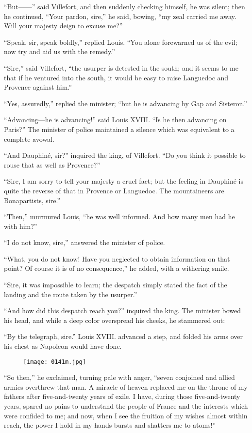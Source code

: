 “But——” said Villefort, and then suddenly checking himself, he was
silent; then he continued, “Your pardon, sire,” he said, bowing, “my
zeal carried me away. Will your majesty deign to excuse me?”

“Speak, sir, speak boldly,” replied Louis. “You alone forewarned us of
the evil; now try and aid us with the remedy.”

“Sire,” said Villefort, “the usurper is detested in the south; and it
seems to me that if he ventured into the south, it would be easy to
raise Languedoc and Provence against him.”

“Yes, assuredly,” replied the minister; “but he is advancing by Gap and
Sisteron.”

“Advancing—he is advancing!” said Louis XVIII. “Is he then advancing on
Paris?” The minister of police maintained a silence which was
equivalent to a complete avowal.

“And Dauphiné, sir?” inquired the king, of Villefort. “Do you think it
possible to rouse that as well as Provence?”

“Sire, I am sorry to tell your majesty a cruel fact; but the feeling in
Dauphiné is quite the reverse of that in Provence or Languedoc. The
mountaineers are Bonapartists, sire.”

“Then,” murmured Louis, “he was well informed. And how many men had he
with him?”

“I do not know, sire,” answered the minister of police.

“What, you do not know! Have you neglected to obtain information on
that point? Of course it is of no consequence,” he added, with a
withering smile.

“Sire, it was impossible to learn; the despatch simply stated the fact
of the landing and the route taken by the usurper.”

“And how did this despatch reach you?” inquired the king. The minister
bowed his head, and while a deep color overspread his cheeks, he
stammered out:

“By the telegraph, sire.” Louis XVIII. advanced a step, and folded his
arms over his chest as Napoleon would have done.

\begin{figure}[ht]
\texttt{[image: 0141m.jpg]}
\end{figure}

“So then,” he exclaimed, turning pale with anger, “seven conjoined and
allied armies overthrew that man. A miracle of heaven replaced me on
the throne of my fathers after five-and-twenty years of exile. I have,
during those five-and-twenty years, spared no pains to understand the
people of France and the interests which were confided to me; and now,
when I see the fruition of my wishes almost within reach, the power I
hold in my hands bursts and shatters me to atoms!”

